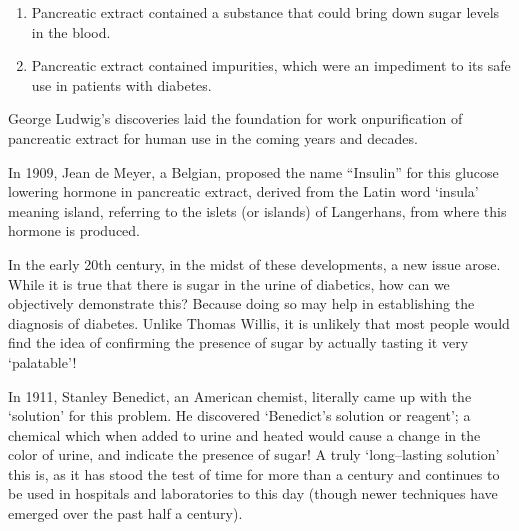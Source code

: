 \begin{enumerate}
\itemsep=0pt
\item Pancreatic extract contained a substance that could bring down sugar levels in the blood.
\item Pancreatic extract contained impurities, which were an impediment to its safe use in patients with diabetes.
\end{enumerate}

George Ludwig’s discoveries laid the foundation for work on\break purification of pancreatic extract for human use in the coming years and decades.

In 1909, Jean de Meyer, a Belgian, proposed the name “Insulin” for this glucose lowering hormone in pancreatic extract, derived from the Latin word ‘insula’ meaning island, referring to the islets (or islands) of Langerhans, from where this hormone is produced.

In the early 20th century, in the midst of these developments, a new issue arose. While it is true that there is sugar in the urine of diabetics, how can we objectively demonstrate this? Because doing so may help in establishing the diagnosis of diabetes. Unlike Thomas Willis, it is unlikely that most people would find the idea of confirming the presence of sugar by actually tasting it very ‘palatable’!

In 1911, Stanley Benedict, an American chemist, literally came up with the ‘solution’ for this problem. He discovered ‘Benedict’s solution or reagent’; a chemical which when added to urine and heated would cause a change in the color of urine, and indicate the presence of sugar! A truly ‘long–lasting solution’ this is, as it has stood the test of time for more than a century and continues to be used in hospitals and laboratories to this day (though newer techniques have emerged over the past half a century).

